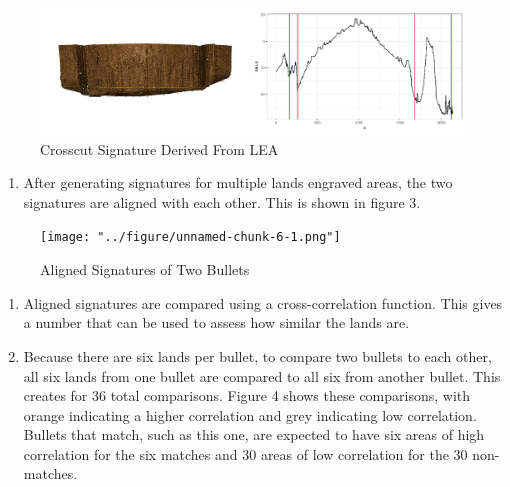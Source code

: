 \documentclass[
  number]{elsarticle}
\providecommand{\tightlist}{%
  \setlength{\itemsep}{0pt}\setlength{\parskip}{0pt}}\usepackage{longtable,booktabs,array}
\begin{document}
\begin{figure}[H]

{\centering \includegraphics{../figure/unnamed-chunk-3-1.png}

}

\caption{Crosscut Signature Derived From LEA}

\end{figure}

\begin{enumerate}
\def\labelenumi{\arabic{enumi}.}
\setcounter{enumi}{2}
\tightlist
\item
  After generating signatures for multiple lands engraved areas, the two
  signatures are aligned with each other. This is shown in figure 3.
\end{enumerate}

\begin{figure}[H]

{\centering \texttt{[image: "../figure/unnamed-chunk-6-1.png"]}

}

\caption{Aligned Signatures of Two Bullets}

\end{figure}

\begin{enumerate}
\def\labelenumi{\arabic{enumi}.}
\setcounter{enumi}{3}
\tightlist
\item
  Aligned signatures are compared using a cross-correlation function.
  This gives a number that can be used to assess how similar the lands
  are.
\item
  Because there are six lands per bullet, to compare two bullets to each
  other, all six lands from one bullet are compared to all six from
  another bullet. This creates for 36 total comparisons. Figure 4 shows
  these comparisons, with orange indicating a higher correlation and
  grey indicating low correlation. Bullets that match, such as this one,
  are expected to have six areas of high correlation for the six matches
  and 30 areas of low correlation for the 30 non-matches.
\end{enumerate}
\end{document}
